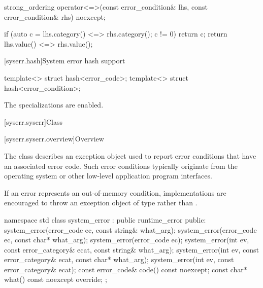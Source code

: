 %
\begin{itemdecl}
strong_ordering operator<=>(const error_condition& lhs, const error_condition& rhs) noexcept;
\end{itemdecl}

\begin{itemdescr}
\pnum
\returns
\begin{codeblock}
if (auto c = lhs.category() <=> rhs.category(); c != 0) return c;
return lhs.value() <=> rhs.value();
\end{codeblock}
\end{itemdescr}

[syserr.hash]{System error hash support}

%
\begin{itemdecl}
template<> struct hash<error_code>;
template<> struct hash<error_condition>;
\end{itemdecl}

\begin{itemdescr}
\pnum
The specializations are enabled.
\end{itemdescr}

[syserr.syserr]{Class }

[syserr.syserr.overview]{Overview}

\pnum
The class  describes an exception object used to
report error conditions that have an associated error code. Such error
conditions typically originate from the operating system or other low-level
application program interfaces.

\pnum
\begin{note}
If an error represents an out-of-memory condition, implementations are
encouraged to throw an exception object of type  rather
than .
\end{note}
%
\begin{codeblock}
namespace std {
  class system_error : public runtime_error {
  public:
    system_error(error_code ec, const string& what_arg);
    system_error(error_code ec, const char* what_arg);
    system_error(error_code ec);
    system_error(int ev, const error_category& ecat, const string& what_arg);
    system_error(int ev, const error_category& ecat, const char* what_arg);
    system_error(int ev, const error_category& ecat);
    const error_code& code() const noexcept;
    const char* what() const noexcept override;
  };
}
\end{codeblock}

